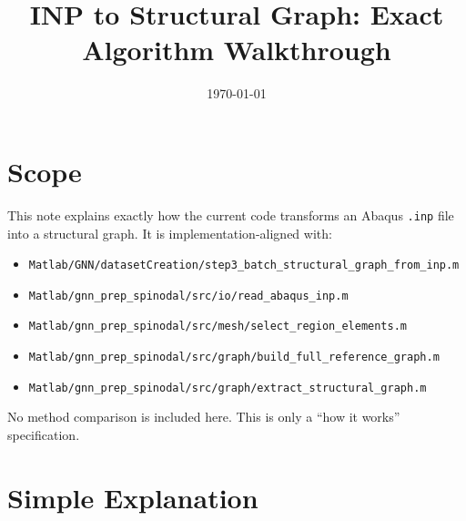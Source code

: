\documentclass[11pt]{article}
\title{INP to Structural Graph: Exact Algorithm Walkthrough}
\author{}
\date{\today}
\begin{document}
\maketitle

\section{Scope}
This note explains exactly how the current code transforms an Abaqus \texttt{.inp} file into a structural graph.
It is implementation-aligned with:
\begin{itemize}
  \item \texttt{Matlab/GNN/datasetCreation/step3\_batch\_structural\_graph\_from\_inp.m}
  \item \texttt{Matlab/gnn\_prep\_spinodal/src/io/read\_abaqus\_inp.m}
  \item \texttt{Matlab/gnn\_prep\_spinodal/src/mesh/select\_region\_elements.m}
  \item \texttt{Matlab/gnn\_prep\_spinodal/src/graph/build\_full\_reference\_graph.m}
  \item \texttt{Matlab/gnn\_prep\_spinodal/src/graph/extract\_structural\_graph.m}
\end{itemize}

No method comparison is included here. This is only a ``how it works'' specification.

\section{Simple Explanation}
\end{document}
